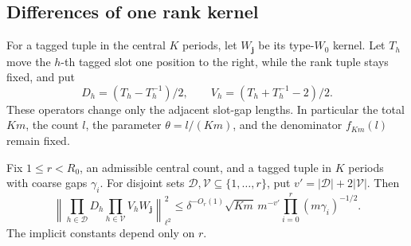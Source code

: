 \subsection{Differences of one rank kernel}

For a tagged tuple in the central \(K\) periods, let \(W_{\mathbf j}\) be its type-\(W_0\) kernel. Let \(T_h\) move the \(h\)-th tagged slot one position to the right, while the rank tuple stays fixed, and put
\[
 D_h=(T_h-T_h^{-1})/2,\qquad
 V_h=(T_h+T_h^{-1}-2)/2.
\]
These operators change only the adjacent slot-gap lengths. In particular the total \(Km\), the count \(l\), the parameter \(\theta=l/(Km)\), and the denominator \(f_{Km}(l)\) remain fixed.

\begin{lemma}\label{lem:base-differences}
Fix \(1\le r<R_0\), an admissible central count, and a tagged tuple in \(K\) periods with coarse gaps \(\gamma_i\). For disjoint sets
\(\mathcal D,\mathcal V\subseteq\{1,\ldots,r\}\), put
\(v'=|\mathcal D|+2|\mathcal V|\). Then
\begin{equation}\label{eq:abase-diff}
 \left\|\prod_{h\in\mathcal D}D_h
             \prod_{h\in\mathcal V}V_h W_{\mathbf j}\right\|_{\ell^2}^2
 \le \delta^{-O_r(1)}\sqrt{Km}\,m^{-v'}
             \prod_{i=0}^r(m\gamma_i)^{-1/2}.
\end{equation}
The implicit constants depend only on \(r\).
\end{lemma}

